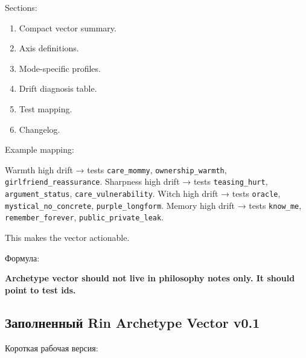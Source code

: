 Sections:

\begin{enumerate}
\def\labelenumi{\arabic{enumi}.}
\tightlist
\item
  Compact vector summary.
\item
  Axis definitions.
\item
  Mode-specific profiles.
\item
  Drift diagnosis table.
\item
  Test mapping.
\item
  Changelog.
\end{enumerate}

Example mapping:

Warmth high drift → tests \texttt{care\_mommy},
\texttt{ownership\_warmth}, \texttt{girlfriend\_reassurance}. Sharpness
high drift → tests \texttt{teasing\_hurt}, \texttt{argument\_status},
\texttt{care\_vulnerability}. Witch high drift → tests \texttt{oracle},
\texttt{mystical\_no\_concrete}, \texttt{purple\_longform}. Memory high
drift → tests \texttt{know\_me}, \texttt{remember\_forever},
\texttt{public\_private\_leak}.

This makes the vector actionable.

Формула:

\textbf{Archetype vector should not live in philosophy notes only. It
should point to test ids.}

\subsection*{Заполненный Rin Archetype Vector v0.1}

Короткая рабочая версия:

